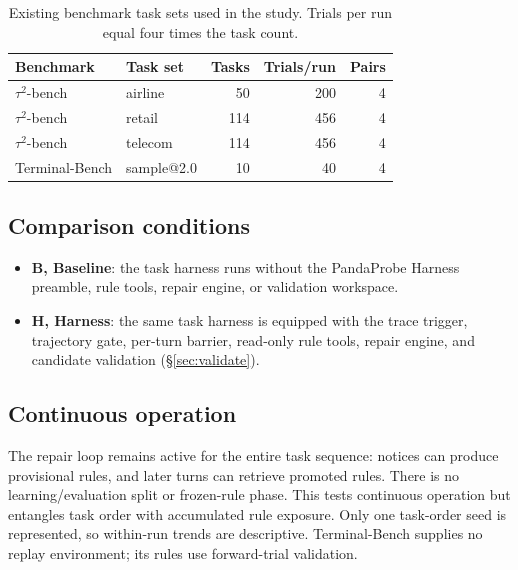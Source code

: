 \documentclass[11pt,letterpaper]{article}
\begin{document}
\begin{table}[H]
\centering\small
\caption{Existing benchmark task sets used in the study. Trials per run equal
four times the task count.}
\label{tab:config}
\begin{tabular}{@{}llrrr@{}}
\toprule
Benchmark & Task set & Tasks & Trials/run & Pairs \\
\midrule
$\tau^2$-bench & airline & 50 & 200 & 4 \\
$\tau^2$-bench & retail & 114 & 456 & 4 \\
$\tau^2$-bench & telecom & 114 & 456 & 4 \\
Terminal-Bench & sample@2.0 & 10 & 40 & 4 \\
\bottomrule
\end{tabular}
\end{table}

\subsection{Comparison conditions}
\label{sec:arms}
\begin{itemize}[leftmargin=*,itemsep=2pt]
\item \textbf{B, Baseline}: the task harness runs without the
PandaProbe Harness preamble, rule tools, repair engine, or validation workspace.
\item \textbf{H, Harness}: the same task harness is equipped with the trace
trigger, trajectory gate, per-turn barrier, read-only rule tools, repair engine,
and candidate validation (\S\ref{sec:validate}).
\end{itemize}

\subsection{Continuous operation}
\label{sec:continuous}
The repair loop remains active for the entire task sequence: notices can
produce provisional rules, and later turns can retrieve promoted rules.
There is no learning/evaluation split or frozen-rule phase. This tests
continuous operation but entangles task order with accumulated rule exposure.
Only one task-order seed is represented, so within-run trends are descriptive.
Terminal-Bench supplies no replay environment; its rules use forward-trial
validation.
\end{document}
